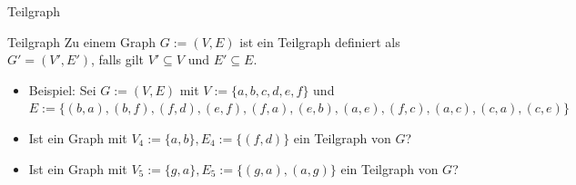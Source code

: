 \begin{frame}{Teilgraph}
	\begin{block}{Teilgraph}
		Zu einem Graph $G := (V, E)$ ist ein Teilgraph definiert als $G' = (V', E')$, falls gilt $V' \subseteq V$ und $E' \subseteq E$.
	\end{block}
	
	\begin{itemize}
		\item Beispiel: Sei $G := (V,E)$ mit $V := \{a,b,c,d,e,f\}$ und $E := \{(b,a),(b,f),(f,d),(e,f),(f,a),(e,b),(a,e),(f,c),(a,c),(c,a),(c,e)\}$
		\p\item Ist ein Graph mit $V_4:=\{a,b\}, E_4:= \{(f,d)\}$ ein Teilgraph von $G$?
		\p\item Ist ein Graph mit $V_5:=\{g,a\}, E_5:=\{(g,a),(a,g)\}$ ein Teilgraph von $G$?
	\end{itemize}
\end{frame}

